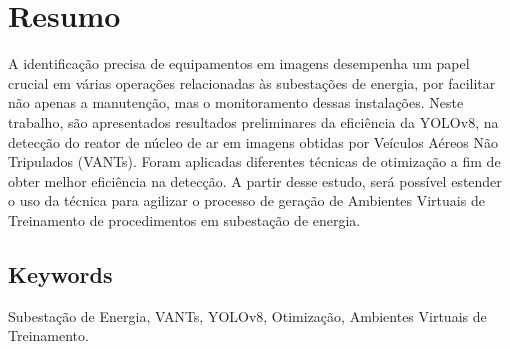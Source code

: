 \newpage
\thispagestyle{empty}
\chapter*{Resumo}
\vspace{-35pt}
A identificação precisa de equipamentos em imagens desempenha um papel crucial em várias operações relacionadas às subestações de energia, por facilitar não apenas a manutenção, mas o monitoramento dessas instalações. Neste trabalho, são apresentados resultados preliminares da eficiência da YOLOv8, na detecção do reator de núcleo de ar em imagens obtidas por Veículos Aéreos Não Tripulados (VANTs). Foram aplicadas diferentes técnicas de otimização a fim de obter melhor eficiência na detecção. A partir desse estudo, será possível estender o uso da técnica para agilizar o processo de geração de Ambientes Virtuais de Treinamento de procedimentos em subestação de energia.
\section*{Keywords}
Subestação de Energia, VANTs, YOLOv8, Otimização, Ambientes Virtuais de Treinamento.
